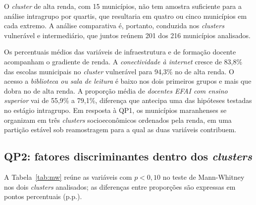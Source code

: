 O \textit{cluster} de alta renda, com 15 municípios, não tem amostra suficiente para a análise intragrupo por quartis, que resultaria em quatro ou cinco municípios em cada extremo. A análise comparativa é, portanto, conduzida nos \textit{clusters} vulnerável e intermediário, que juntos reúnem 201 dos 216 municípios analisados.

Os percentuais médios das variáveis de infraestrutura e de formação docente acompanham o gradiente de renda. A \textit{conectividade à internet} cresce de 83,8\% das escolas municipais no \textit{cluster} vulnerável para 94,3\% no de alta renda. O acesso a \textit{biblioteca ou sala de leitura} é baixo nos dois primeiros grupos e mais que dobra no de alta renda. A proporção média de \textit{docentes EFAI com ensino superior} vai de 55,9\% a 79,1\%, diferença que antecipa uma das hipóteses testadas no estágio intragrupo. Em resposta à QP1, os municípios maranhenses se organizam em três \textit{clusters} socioeconômicos ordenados pela renda, em uma partição estável sob reamostragem para a qual as duas variáveis contribuem.

\subsection{QP2: fatores discriminantes dentro dos \textit{clusters}}

A Tabela~\ref{tab:mw} reúne as variáveis com $p < 0{,}10$ no teste de Mann-Whitney nos dois \textit{clusters} analisados; as diferenças entre proporções são expressas em pontos percentuais (p.p.).

